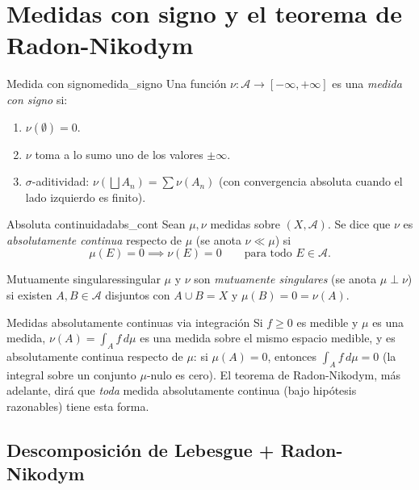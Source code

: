 \documentclass[11pt, a4paper]{article}
\begin{document}
\newpage

\section{Medidas con signo y el teorema de Radon-Nikodym}

\begin{definicion}{Medida con signo}{medida_signo}
Una función $\nu: \mathcal{A} \to [-\infty, +\infty]$ es una \emph{medida con signo} si:
\begin{enumerate}
    \item $\nu(\emptyset) = 0$.
    \item $\nu$ toma a lo sumo uno de los valores $\pm\infty$.
    \item $\sigma$-aditividad: $\nu(\bigsqcup A_n) = \sum \nu(A_n)$ (con convergencia absoluta
    cuando
    el lado izquierdo es finito).
\end{enumerate}
\end{definicion}

\begin{definicion}{Absoluta continuidad}{abs_cont}
Sean $\mu, \nu$ medidas sobre $(X, \mathcal{A})$. Se dice que $\nu$ es \emph{absolutamente continua}
respecto de $\mu$ (se anota $\nu \ll \mu$) si
$$ \mu(E) = 0 \implies \nu(E) = 0 \qquad \text{para todo } E \in \mathcal{A}. $$
\end{definicion}

\begin{definicion}{Mutuamente singulares}{singular}
$\mu$ y $\nu$ son \emph{mutuamente singulares} (se anota $\mu \perp \nu$) si existen
$A, B \in \mathcal{A}$ disjuntos con $A \cup B = X$ y $\mu(B) = 0 = \nu(A)$.
\end{definicion}

\begin{ejemplo}{Medidas absolutamente continuas via integración}{}
Si $f \ge 0$ es medible y $\mu$ es una medida, $\nu(A) = \int_A f \, d\mu$ es una medida sobre el
mismo espacio medible, y es absolutamente continua respecto de $\mu$: si $\mu(A) = 0$, entonces
$\int_A f \, d\mu = 0$ (la integral sobre un conjunto $\mu$-nulo es cero). El teorema de
Radon-Nikodym, más adelante, dirá que \emph{toda} medida absolutamente continua (bajo
hipótesis razonables) tiene esta forma.
\end{ejemplo}

\subsection{Descomposición de Lebesgue + Radon-Nikodym}
\end{document}
